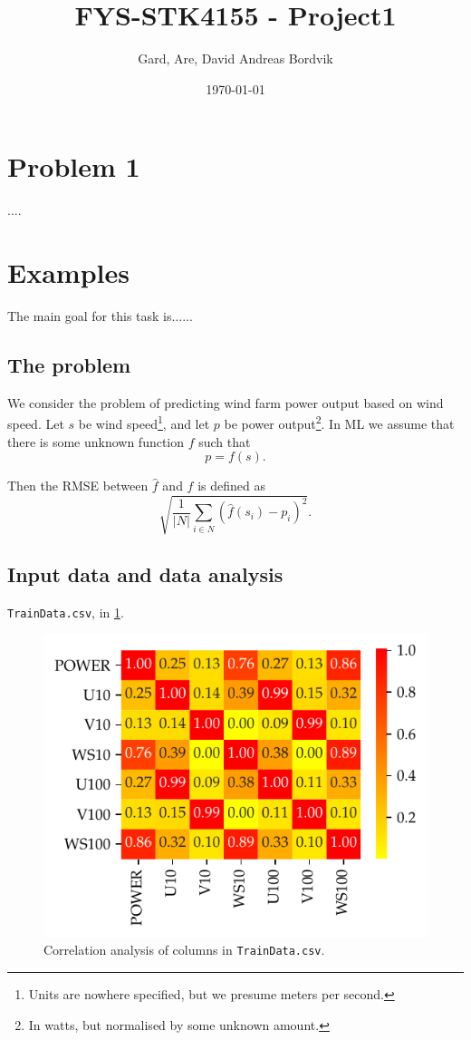 \documentclass[11pt]{article}
\title{FYS-STK4155 - Project1}
\author{Gard, Are, David Andreas Bordvik}
\date{\today}
\begin{document}
\maketitle
\section*{Problem 1}
....
\newpage
\newpage
\section*{Examples}
The main goal for this task is......


\subsection*{The problem}
We consider the problem of predicting wind farm power output based on wind speed.
Let $s$ be wind speed\footnote{Units are nowhere specified, but we presume meters per second.}, and let $p$ be power output\footnote{In watts, but normalised by some unknown amount.}. In ML we assume that there is some unknown function $f$ such that
\begin{equation*}
  p = f(s).
\end{equation*}

Then the RMSE between $\hat{f}$ and $f$ is defined as
\begin{equation*}
  \sqrt{\frac{1}{|N|} \sum_{i \in N} \left(\hat{f}(s_i) - p_i\right)^2}.
\end{equation*}


\subsection*{Input data and data analysis}
\texttt{TrainData.csv}, in \cref{fig:q1-corr-analysis}.

\begin{figure}
  \centering
  \includegraphics{figures/q1_corr_analysis.pdf}
  \caption{Correlation analysis of columns in \texttt{TrainData.csv}.}
  \label{fig:q1-corr-analysis}
\end{figure}
\end{document}
